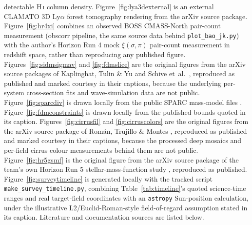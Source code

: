 \documentclass[10pt,onecolumn]{article}
\begin{document}
detectable H\,\textsc{i} column density. Figure~\ref{fig:lya3dexternal} is an external CLAMATO 3D Ly$\alpha$ forest tomography rendering from the arXiv source package. Figure~\ref{fig:hr4xi} combines an observed BOSS CMASS-North pair-count measurement (obscorr pipeline, the same source data behind \texttt{plot\_bao\_jk.py}) with the author's Horizon Run 4 mock $\xi(\sigma,\pi)$ pair-count measurement in redshift space, rather than reproducing any published figure. Figures~\ref{fig:sidmsigmav} and \ref{fig:fdmslice} are the original figures from the arXiv source packages of Kaplinghat, Tulin \& Yu \cite{kaplinghat2016} and Schive et~al.\ \cite{schive2014}, reproduced as published and marked courtesy in their captions, because the underlying per-system cross-section fits and wave-simulation data are not public. Figure~\ref{fig:sparcdiv} is drawn locally from the public SPARC mass-model files \cite{lelli2016}. Figure~\ref{fig:fdmconstraints} is drawn locally from the published bounds quoted in its caption. Figures~\ref{fig:cirrusfil} and \ref{fig:cirruscolors} are the original figures from the arXiv source package of Rom\'an, Trujillo \& Montes \cite{roman2020}, reproduced as published and marked courtesy in their captions, because the processed deep mosaics and per-field cirrus colour measurements behind them are not public. Figure~\ref{fig:hr5gsmf} is the original figure from the arXiv source package of the team's own Horizon Run 5 stellar-mass-function study \cite{kim2023gsmf}, reproduced as published. Figure~\ref{fig:surveytimeline} is generated locally with the tracked script \texttt{make\_survey\_timeline.py}, combining Table~\ref{tab:timeline}'s quoted science-time ranges and real target-field coordinates with an \texttt{astropy} Sun-position calculation, under the illustrative L2/Euclid-Roman-style field-of-regard assumption stated in its caption. Literature and documentation sources are listed below.
\end{document}
